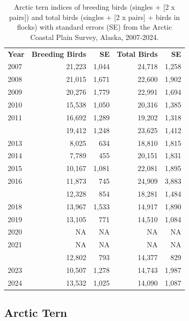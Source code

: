 \documentclass[
]{article}
\begin{document}
\begin{longtable}[t]{lrrrr}

\caption{\label{tbl-ARTE}Arctic tern indices of breeding birds (singles
+ {[}2 x pairs{]}) and total birds (singles + {[}2 x pairs{]} + birds in
flocks) with standard errors (SE) from the Arctic Coastal Plain Survey,
Alaska, 2007-2024.}

\tabularnewline

\\
\toprule
\textbf{Year} & \textbf{Breeding Birds} & \textbf{SE} & \textbf{Total Birds} & \textbf{SE}\\
\midrule
2007 & 21,223 & 1,044 & 24,718 & 1,258\\
2008 & 21,015 & 1,671 & 22,600 & 1,902\\
2009 & 20,276 & 1,779 & 22,991 & 1,694\\
2010 & 15,538 & 1,050 & 20,316 & 1,385\\
2011 & 16,692 & 1,289 & 19,202 & 1,318\\
\addlinespace
2012 & 19,412 & 1,248 & 23,625 & 1,412\\
2013 & 8,025 & 634 & 18,810 & 1,815\\
2014 & 7,789 & 455 & 20,151 & 1,831\\
2015 & 10,167 & 1,081 & 22,081 & 1,895\\
2016 & 11,873 & 745 & 24,909 & 3,883\\
\addlinespace
2017 & 12,328 & 854 & 18,281 & 1,484\\
2018 & 13,967 & 1,533 & 14,917 & 1,890\\
2019 & 13,105 & 771 & 14,510 & 1,084\\
2020 & NA & NA & NA & NA\\
2021 & NA & NA & NA & NA\\
\addlinespace
2022 & 12,802 & 793 & 14,377 & 829\\
2023 & 10,507 & 1,278 & 14,743 & 1,987\\
2024 & 13,532 & 1,025 & 14,090 & 1,087\\
\bottomrule

\end{longtable}

\endgroup{}

\newpage{}

\subsection*{Arctic Tern}\label{arctic-tern-2}
\end{document}
